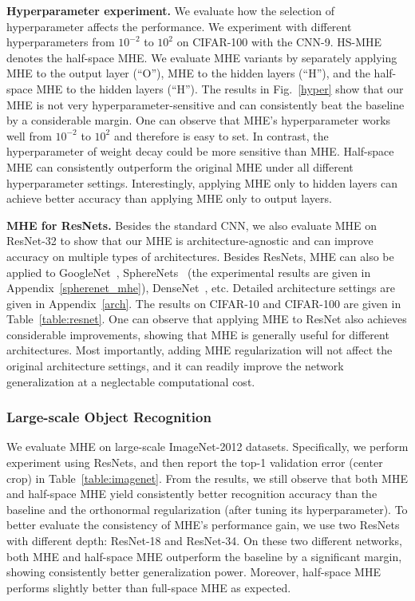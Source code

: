 \textbf{Hyperparameter experiment.} We evaluate how the selection of hyperparameter affects the performance. We experiment with different hyperparameters from $10^{-2}$ to $10^2$ on CIFAR-100 with the CNN-9. HS-MHE denotes the half-space MHE. We evaluate MHE variants by separately applying MHE to the output layer (``O''), MHE to the hidden layers (``H''), and the half-space MHE to the hidden layers (``H''). The results in Fig.~\ref{hyper} show that our MHE is not very hyperparameter-sensitive and can consistently beat the baseline by a considerable margin. One can observe that MHE's hyperparameter works well from $10^{-2}$ to $10^2$ and therefore is easy to set. In contrast, the hyperparameter of weight decay could be more sensitive than MHE. Half-space MHE can consistently outperform the original MHE under all different hyperparameter settings. Interestingly, applying MHE only to hidden layers can achieve better accuracy than applying MHE only to output layers.
\par

\textbf{MHE for ResNets.} Besides the standard CNN, we also evaluate MHE on ResNet-32 to show that our MHE is architecture-agnostic and can improve accuracy on multiple types of architectures. Besides ResNets, MHE can also be applied to GoogleNet~\cite{szegedy2015going}, SphereNets~\cite{liu2017hyper} (the experimental results are given in Appendix~\ref{spherenet_mhe}), DenseNet~\cite{huang2017densely}, etc. Detailed architecture settings are given in Appendix~\ref{arch}. The results on CIFAR-10 and CIFAR-100 are given in Table~\ref{table:resnet}. One can observe that applying MHE to ResNet also achieves considerable improvements, showing that MHE is generally useful for different architectures. Most importantly, adding MHE regularization will not affect the original architecture settings, and it can readily improve the network generalization at a neglectable computational cost.
\par

\subsubsection{Large-scale Object Recognition}

We evaluate MHE on large-scale ImageNet-2012 datasets. Specifically, we perform experiment using ResNets, and then report the top-1 validation error (center crop) in Table~\ref{table:imagenet}. From the results, we still observe that both MHE and half-space MHE yield consistently better recognition accuracy than the baseline and the orthonormal regularization (after tuning its hyperparameter). To better evaluate the consistency of MHE's performance gain, we use two ResNets with different depth: ResNet-18 and ResNet-34. On these two different networks, both MHE and half-space MHE outperform the baseline by a significant margin, showing consistently better generalization power. Moreover, half-space MHE performs slightly better than full-space MHE as expected.


